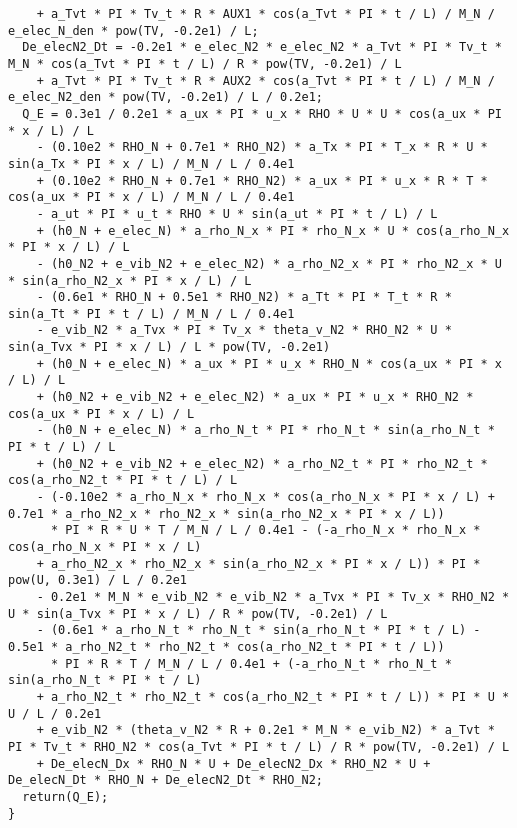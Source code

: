 \documentclass[10pt]{article}
\begin{document}
\begin{scriptsize}
\begin{verbatim}
    + a_Tvt * PI * Tv_t * R * AUX1 * cos(a_Tvt * PI * t / L) / M_N / e_elec_N_den * pow(TV, -0.2e1) / L;
  De_elecN2_Dt = -0.2e1 * e_elec_N2 * e_elec_N2 * a_Tvt * PI * Tv_t * M_N * cos(a_Tvt * PI * t / L) / R * pow(TV, -0.2e1) / L 
    + a_Tvt * PI * Tv_t * R * AUX2 * cos(a_Tvt * PI * t / L) / M_N / e_elec_N2_den * pow(TV, -0.2e1) / L / 0.2e1;
  Q_E = 0.3e1 / 0.2e1 * a_ux * PI * u_x * RHO * U * U * cos(a_ux * PI * x / L) / L 
    - (0.10e2 * RHO_N + 0.7e1 * RHO_N2) * a_Tx * PI * T_x * R * U * sin(a_Tx * PI * x / L) / M_N / L / 0.4e1 
    + (0.10e2 * RHO_N + 0.7e1 * RHO_N2) * a_ux * PI * u_x * R * T * cos(a_ux * PI * x / L) / M_N / L / 0.4e1 
    - a_ut * PI * u_t * RHO * U * sin(a_ut * PI * t / L) / L 
    + (h0_N + e_elec_N) * a_rho_N_x * PI * rho_N_x * U * cos(a_rho_N_x * PI * x / L) / L 
    - (h0_N2 + e_vib_N2 + e_elec_N2) * a_rho_N2_x * PI * rho_N2_x * U * sin(a_rho_N2_x * PI * x / L) / L 
    - (0.6e1 * RHO_N + 0.5e1 * RHO_N2) * a_Tt * PI * T_t * R * sin(a_Tt * PI * t / L) / M_N / L / 0.4e1 
    - e_vib_N2 * a_Tvx * PI * Tv_x * theta_v_N2 * RHO_N2 * U * sin(a_Tvx * PI * x / L) / L * pow(TV, -0.2e1) 
    + (h0_N + e_elec_N) * a_ux * PI * u_x * RHO_N * cos(a_ux * PI * x / L) / L 
    + (h0_N2 + e_vib_N2 + e_elec_N2) * a_ux * PI * u_x * RHO_N2 * cos(a_ux * PI * x / L) / L 
    - (h0_N + e_elec_N) * a_rho_N_t * PI * rho_N_t * sin(a_rho_N_t * PI * t / L) / L 
    + (h0_N2 + e_vib_N2 + e_elec_N2) * a_rho_N2_t * PI * rho_N2_t * cos(a_rho_N2_t * PI * t / L) / L 
    - (-0.10e2 * a_rho_N_x * rho_N_x * cos(a_rho_N_x * PI * x / L) + 0.7e1 * a_rho_N2_x * rho_N2_x * sin(a_rho_N2_x * PI * x / L)) 
      * PI * R * U * T / M_N / L / 0.4e1 - (-a_rho_N_x * rho_N_x * cos(a_rho_N_x * PI * x / L) 
    + a_rho_N2_x * rho_N2_x * sin(a_rho_N2_x * PI * x / L)) * PI * pow(U, 0.3e1) / L / 0.2e1 
    - 0.2e1 * M_N * e_vib_N2 * e_vib_N2 * a_Tvx * PI * Tv_x * RHO_N2 * U * sin(a_Tvx * PI * x / L) / R * pow(TV, -0.2e1) / L 
    - (0.6e1 * a_rho_N_t * rho_N_t * sin(a_rho_N_t * PI * t / L) - 0.5e1 * a_rho_N2_t * rho_N2_t * cos(a_rho_N2_t * PI * t / L)) 
      * PI * R * T / M_N / L / 0.4e1 + (-a_rho_N_t * rho_N_t * sin(a_rho_N_t * PI * t / L) 
    + a_rho_N2_t * rho_N2_t * cos(a_rho_N2_t * PI * t / L)) * PI * U * U / L / 0.2e1 
    + e_vib_N2 * (theta_v_N2 * R + 0.2e1 * M_N * e_vib_N2) * a_Tvt * PI * Tv_t * RHO_N2 * cos(a_Tvt * PI * t / L) / R * pow(TV, -0.2e1) / L 
    + De_elecN_Dx * RHO_N * U + De_elecN2_Dx * RHO_N2 * U + De_elecN_Dt * RHO_N + De_elecN2_Dt * RHO_N2;
  return(Q_E);
}
\end{verbatim}
\end{scriptsize}
\end{document}
